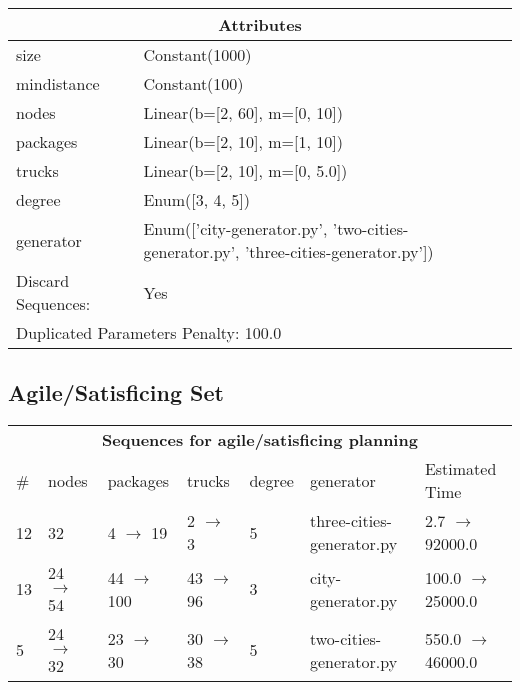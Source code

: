 \documentclass{article}
\begin{document}
                    \begin{center}
                    \begin{tabular}{p{}p{}}
                    \multicolumn{2}{c}{\bf \large Attributes}\\\midrule
                    size & Constant(1000)\\
mindistance & Constant(100)\\
nodes & Linear(b=[2, 60], m=[0, 10])\\
packages & Linear(b=[2, 10], m=[1, 10])\\
trucks & Linear(b=[2, 10], m=[0, 5.0])\\
degree & Enum([3, 4, 5])\\
generator & Enum(['city-generator.py', 'two-cities-generator.py', 'three-cities-generator.py'])
                    
                    
                                \\\midrule
                                Discard Sequences: & Yes 
                             \\\midrule
                    \multicolumn{2}{l}{Duplicated Parameters Penalty: 100.0}
                    \end{tabular}
                    \end{center}
                
                         \subsection*{Agile/Satisficing Set}

                        \begin{center}
                        \begin{tabular}{l|l|l|l|l|l|l}
                        \multicolumn{7}{c}{\bf \large Sequences for agile/satisficing planning}\\
                        \# & nodes & packages & trucks & degree & generator & Estimated Time\\\midrule
                        12&32&4 $\rightarrow$ 19&2 $\rightarrow$ 3&5&three-cities-generator.py&2.7 $\rightarrow$ 92000.0\\
13&24 $\rightarrow$ 54&44 $\rightarrow$ 100&43 $\rightarrow$ 96&3&city-generator.py&100.0 $\rightarrow$ 25000.0\\
5&24 $\rightarrow$ 32&23 $\rightarrow$ 30&30 $\rightarrow$ 38&5&two-cities-generator.py&550.0 $\rightarrow$ 46000.0
                        \end{tabular}
                        \end{center}
                    
\end{document}

